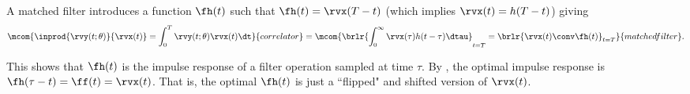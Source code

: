 A matched filter introduces a function $\fh(t)$ such that
$\fh(t) =\rvx(T-t)$ (which implies $\rvx(t)=h(T-t)$) giving
  \[
    \mcom{\inprod{\rvy(t;\theta)}{\rvx(t)} = \int_0^T \rvy(t;\theta)\rvx(t)\dt }
         {correlator}
    =
    \mcom{\brlr{\int_0^\infty \rvx(\tau)h(t-\tau)\dtau}_{t=T}
            = \brlr{\rvx(t)\conv \fh(t)}_{t=T}
         }{matched filter}.
  \]

This shows that $\fh(t)$ is the impulse response of a filter operation
sampled at time $\tau$. %
By , the optimal impulse response is
$\fh(\tau-t)=\ff(t)=\rvx(t)$.
That is, the optimal $\fh(t)$ is just a ``flipped" and shifted version of $\rvx(t)$.

